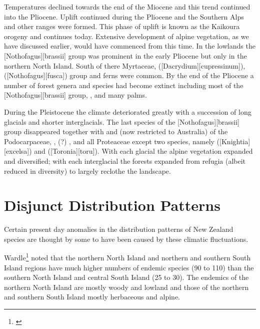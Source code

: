 Temperatures declined towards the end of the Miocene and this trend continued into the Pliocene.
Uplift continued during the Pliocene and the Southern Alps and other ranges were formed.
This phase of uplift is known as the Kaikoura orogeny and continues today.
Extensive development of alpine vegetation, as we have discussed earlier, would have commenced from this time.
In the lowlands the [Nothofagus][brassii] group was prominent in the early Pliocene but only in the northern North Island.
South of there Myrtaceae,  ([Dacrydium][cupressinum]),  ([Nothofagus][fusca]) group and ferns were common.
By the end of the Pliocene a number of forest genera and species had become extinct including most of the [Nothofagus][brassii] group, ,  and many palms.

During the Pleistocene the climate deteriorated greatly with a succession of long glacials and shorter interglacials.
The last species of the [Nothofagus][brassii] group disappeared together with  and  (now restricted to Australia) of the Podocarpaceae, , (?) ,  and all Proteaceae except two species, namely  ([Knightia][excelsa]) and  ([Toronia][toru]).
With each glacial the alpine vegetation expanded and diversified; with each interglacial the forests expanded from refugia (albeit reduced in diversity) to largely reclothe the landscape.

\section{Disjunct Distribution Patterns}

Certain present day anomalies in the distribution patterns of New Zealand species are thought by some to have been caused by these climatic fluctuations.

Wardle\footnote{\cite{wardle1963evolution}} noted that the northern North Island and northern and southern South Island regions have much higher numbers of endemic species (90 to 110) than the southern North Island and central South Island (25 to 30).
The endemics of the northern North Island are mostly woody and lowland and those of the northern and southern South Island mostly herbaceous and alpine.

